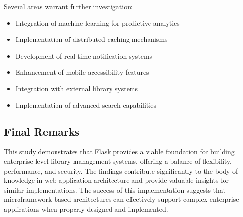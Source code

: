 \documentclass{article}
\begin{document}
Several areas warrant further investigation:

\begin{itemize}
    \item Integration of machine learning for predictive analytics
    \item Implementation of distributed caching mechanisms
    \item Development of real-time notification systems
    \item Enhancement of mobile accessibility features
    \item Integration with external library systems
    \item Implementation of advanced search capabilities
\end{itemize}

\subsection{Final Remarks}

This study demonstrates that Flask provides a viable foundation for building enterprise-level library management systems, offering a balance of flexibility, performance, and security. The findings contribute significantly to the body of knowledge in web application architecture and provide valuable insights for similar implementations. The success of this implementation suggests that microframework-based architectures can effectively support complex enterprise applications when properly designed and implemented.



\end{document}
